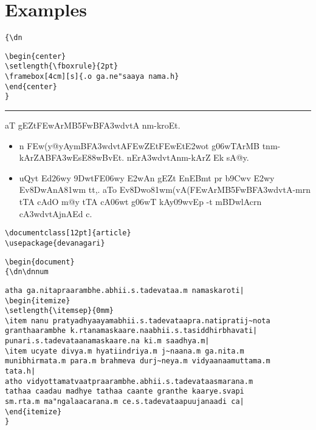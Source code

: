 \documentclass[12pt]{article}
\begin{document}
\section{Examples}

{\dn
\begin{center}
\setlength{\fboxrule}{2pt}
\end{center}
}

\verb+{\+{\tt dn}
\begin{verbatim}
\begin{center}
\setlength{\fboxrule}{2pt}
\framebox[4cm][s]{.o ga.ne"saaya nama.h}
\end{center}
}
\end{verbatim}

\hrule
\medskip

{\dn\dnnum
a\-T g\-EZ\-t\-\3FEwA\-r\-MB\?\35FwBF\-\3A3w\-d\?\-v\-tA\2 n\-m\--k\-ro\-Et.
\begin{itemize}
\setlength{\itemsep}{0mm}
\item n\- \3FEw\-(y\-@yA\-y\-m\-BF\-\3A3w\-d\?\-v\-tA\-\3FEw\-Z\-Et\-\3FEw\-Et\-\3E2wo\-t
g\5\-\306wTA\-r\-MB\? \-t\-n\-m\--kA\-r\?\-ZA\-BF\-\3A3w\-Es\-E\388w\-B\0\-v\-Et.
\-n\-Er\-\3A3w\-d\?\-v\-tA\-n\-m\--kA\-r\?\-Z Ek\2 sA\-@y\2.
\item u\-Qy\-t\? Ed\-\326wy\2 \39Dw\-tF\-E\306w\-y\2 \3E2wA\-n\2 g\-EZ\-t\2
\-En\-EB\-m\0\-t\2 p\-r\2 b\5\-\39Cw\?\-v \-\3E2w\?{\qvb}\-y\2 Ev\-\38DwA\-nA\-\-\381w\-m\2
t\-t,. a\-To Ev\-\38Dwo\-\381w\-m\-(vA\-(\3FEwA\-r\-MB\?\35FwBF\-\3A3w\-d\?\-v\-tA\--m\-r\-n\2
t\-TA cA\-dO m\-@y\? t\-TA cA\-\306wt\? g\5\-\306wT\? kA\-y\?{\qvb}\-\309wv\-Ep
-\-t\2 m\-\3BDw\-lA\-c\-r\-n\2 c\?\-\3A3w\-d\?\-v\-tA\-\-j\-nA\-Ed c.
\end{itemize}
}

\begin{verbatim}
\documentclass[12pt]{article}
\usepackage{devanagari}
\end{verbatim}
\verb+\+\verb+begin{document}+ \\
\verb+{\+{\tt dn}\verb+\+{\tt dnnum}
\begin{verbatim}
atha ga.nitapraarambhe.abhii.s.tadevataa.m namaskaroti|
\begin{itemize}
\setlength{\itemsep}{0mm}
\item nanu pratyadhyaayamabhii.s.tadevataapra.natipratij~nota
granthaarambhe k.rtanamaskaare.naabhii.s.tasiddhirbhavati|
punari.s.tadevataanamaskaare.na ki.m saadhya.m|
\item ucyate divya.m hyatiindriya.m j~naana.m ga.nita.m
munibhirmata.m para.m brahmeva durj~neya.m vidyaanaamuttama.m
tata.h|
atho vidyottamatvaatpraarambhe.abhii.s.tadevataasmarana.m
tathaa caadau madhye tathaa caante granthe kaarye.svapi
sm.rta.m ma"ngalaacarana.m ce.s.tadevataapuujanaadi ca|
\end{itemize}
}
\end{verbatim}
\end{document}
